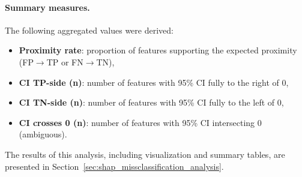 \paragraph{Summary measures.}
The following aggregated values were derived:
\begin{itemize}
  \item \textbf{Proximity rate}: proportion of features supporting the expected proximity (FP\(\rightarrow\)TP or FN\(\rightarrow\)TN),
  \item \textbf{CI TP-side (n)}: number of features with 95\% CI fully to the right of 0,
  \item \textbf{CI TN-side (n)}: number of features with 95\% CI fully to the left of 0,
  \item \textbf{CI crosses 0 (n)}: number of features with 95\% CI intersecting 0 (ambiguous).
\end{itemize}

The results of this analysis, including visualization and summary tables, are presented in Section~\ref{sec:shap_missclassification_analysis}.



